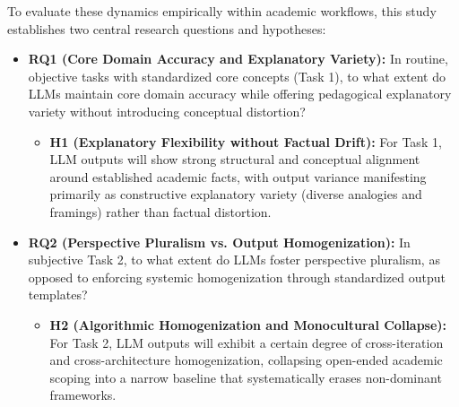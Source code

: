 To evaluate these dynamics empirically within academic workflows, this study establishes two central research questions and hypotheses:
\begin{itemize}
  \item \textbf{RQ1 (Core Domain Accuracy and Explanatory Variety):} In routine, objective tasks with standardized core concepts (Task 1), to what extent do LLMs maintain core domain accuracy while offering pedagogical explanatory variety without introducing conceptual distortion?
  \begin{itemize}
    \item \textbf{H1 (Explanatory Flexibility without Factual Drift):} For Task 1, LLM outputs will show strong structural and conceptual alignment around established academic facts, with output variance manifesting primarily as constructive explanatory variety (diverse analogies and framings) rather than factual distortion.
  \end{itemize}
  \item \textbf{RQ2 (Perspective Pluralism vs. Output Homogenization):} In subjective Task 2, to what extent do LLMs foster perspective pluralism, as opposed to enforcing systemic homogenization through standardized output templates?
  \begin{itemize}
    \item \textbf{H2 (Algorithmic Homogenization and Monocultural Collapse):} For Task 2, LLM outputs will exhibit a certain degree of cross-iteration and cross-architecture homogenization, collapsing open-ended academic scoping into a narrow baseline that systematically erases non-dominant frameworks.
  \end{itemize}
\end{itemize}

